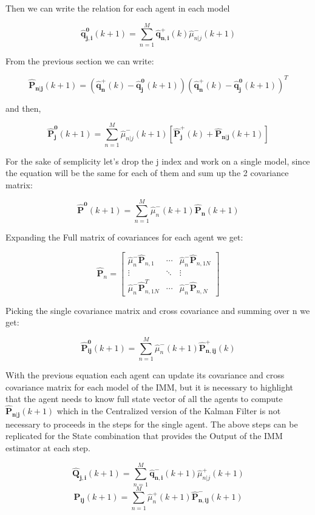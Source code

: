 \documentclass[conference]{IEEEtran}
\begin{document}
Then we can write the relation for each agent in each model

$$ \mathbf{\hat{q}_{j,i}^{0}}(k+1) = \sum_{n = 1}^{M} \mathbf{\hat{q}_{n,i}^{+}}(k)\hat{\mu}_{n|j}^{-}(k+1) $$

From the previous section we can write:

$$\mathbf{\hat{P}_{n|j}}(k+1) = ( \mathbf{\hat{q}_{n}^{+}}(k) -  \mathbf{\hat{q}_{j}^{0}}(k+1))( \mathbf{\hat{q}_{n}^{+}}(k) -  \mathbf{\hat{q}_{j}^{0}}(k+1))^{T}  $$

and then,

$$ \mathbf{\hat{P}_{j}^{0}}(k+1) = \sum_{n = 1}^{M} \hat{\mu}_{n|j}^{-}(k+1)[\mathbf{\hat{ P}_{j}^{+}}(k)+\mathbf{\hat{P}_{n|j}}(k+1)  ] $$

For the sake of semplicity let's drop the j index and work on a single model, since the equation will be the same for each of them and sum up the 2 covariance matrix:

$$ \mathbf{\hat{P}^{0}}(k+1) = \sum_{n = 1}^{M} \hat{\mu}_{n}^{-}(k+1)\mathbf{\hat{P}_{n}}(k+1)  $$

Expanding the Full matrix of covariances for each agent we get:

$$ \mathbf{\hat{P}}_{n} =  \begin{bmatrix}  \hat{\mu}_{n}^{-}\mathbf{\hat{P}}_{n,1}  & \cdots & \hat{\mu}_{n}^{-}\mathbf{\hat{P}}_{n,1N}   \\ \vdots & \ddots & \vdots \\  \hat{\mu}_{n}^{-}\mathbf{\hat{P}}_{n,1N}^{T} & \cdots &  \hat{\mu}_{n}^{-}\mathbf{\hat{P}}_{n,N}   \end{bmatrix} $$

Picking the single covariance matrix and cross covariance and summing over n we get:

$$ \mathbf{\hat{P}_{ij}^{0}}(k+1) = \sum_{n = 1}^{M} \hat{\mu}_{n}^{-}(k+1)\mathbf{\hat{P}_{n,ij}^{+}}(k)  $$

With the previous equation each agent can update its covariance and cross covariance matrix for each model of the IMM, but it is necessary to highlight that the agent needs to know full state vector of all the agents to compute $ \mathbf{\hat{P}_{n|j}}(k+1)$ which in the Centralized version of the Kalman Filter is not necessary to proceeds in the steps for the single agent.
The above steps can be replicated for the State combination that provides the Output of the IMM estimator at each step.

$$ \mathbf{\hat{Q}_{j,i}}(k+1) = \sum_{n = 1}^{M} \mathbf{\hat{q}_{n,i}^{-}}(k+1)\hat{\mu}_{n|j}^{+}(k+1) $$
$$ \mathbf{P_{ij}}(k+1) = \sum_{n = 1}^{M} \hat{\mu}_{n}^{+}(k+1)\mathbf{\hat{P}_{n,ij}^{-}}(k+1)  $$
\end{document}
